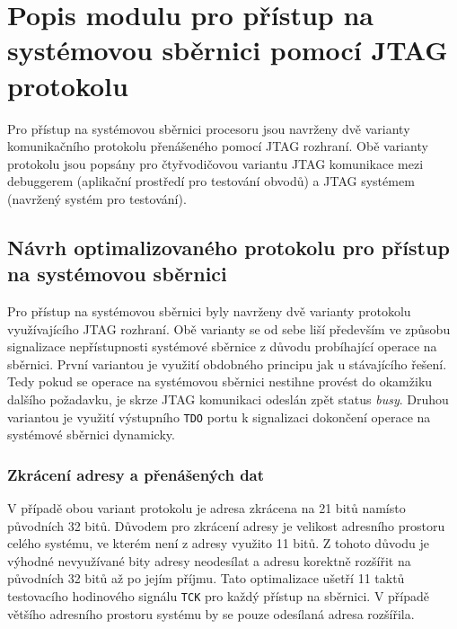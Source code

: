 \chapter{Popis modulu pro přístup na systémovou sběrnici pomocí JTAG protokolu}	\label{jtag_ap}
Pro přístup na systémovou sběrnici procesoru jsou navrženy dvě varianty komunikačního protokolu přenášeného pomocí JTAG rozhraní. Obě varianty protokolu jsou popsány pro čtyřvodičovou variantu \acs{JTAG} komunikace mezi debuggerem (aplikační prostředí pro testování obvodů) a \acs{JTAG} systémem (navržený systém pro testování).

\section{Návrh optimalizovaného protokolu pro přístup na systémovou sběrnici}	\label{sec:protokoly}
Pro přístup na systémovou sběrnici byly navrženy dvě varianty protokolu využívajícího JTAG rozhraní. Obě varianty se od sebe liší především ve způsobu signalizace nepřístupnosti systémové sběrnice z důvodu probíhající operace na sběrnici. První variantou je využití obdobného principu jak u stávajícího řešení. Tedy pokud se operace na systémovou sběrnici nestihne provést do okamžiku dalšího požadavku, je skrze JTAG komunikaci odeslán zpět status \textit{busy}. Druhou variantou je využití výstupního \texttt{\acs{TDO}} portu k signalizaci dokončení operace na systémové sběrnici dynamicky.

\subsection{Zkrácení adresy a přenášených dat}
V případě obou variant protokolu je adresa zkrácena na 21 bitů namísto původních 32 bitů. Důvodem pro zkrácení adresy je velikost adresního prostoru celého systému, ve kterém není z adresy využito 11 bitů. Z tohoto důvodu je výhodné nevyužívané bity adresy neodesílat a adresu korektně rozšířit na původních 32 bitů až po jejím příjmu. Tato optimalizace ušetří 11 taktů testovacího hodinového signálu \texttt{\acs{TCK}} pro každý přístup na sběrnici. V případě většího adresního prostoru systému by se pouze odesílaná adresa rozšířila.

